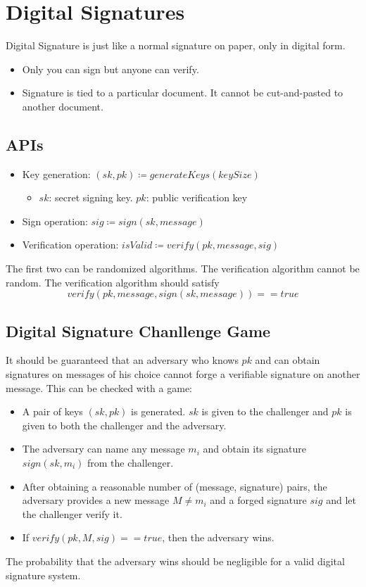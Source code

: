 \section{Digital Signatures}
Digital Signature is just like a normal signature on paper, only in digital form.
\begin{itemize}
  \item Only you can sign but anyone can verify.
  \item Signature is tied to a particular document. It cannot be cut-and-pasted to another document.
\end{itemize}
\subsection{APIs}
\begin{itemize}
  \item Key generation: $(sk, pk)\coloneqq generateKeys(keySize)$
  \begin{itemize}
    \item $sk$: secret signing key. $pk$: public verification key
  \end{itemize}
  \item Sign operation: $sig\coloneqq sign(sk, message)$
  \item Verification operation: $isValid\coloneqq verify(pk, message, sig)$
\end{itemize}
The first two can be randomized algorithms. The verification algorithm cannot be random. The verification algorithm should satisfy 
\[verify(pk, message, sign(sk, message)) == true \]
\subsection{Digital Signature Chanllenge Game}
It should be guaranteed that an adversary who knows $pk$ and can obtain signatures on messages of his choice cannot forge a verifiable signature on another message. This can be checked with a game:
\begin{itemize}
  \item A pair of keys $(sk, pk)$ is generated. $sk$ is given to the challenger and $pk$ is given to both the challenger and the adversary.
  \item The adversary can name any message $m_i$ and obtain its signature $sign(sk, m_i)$ from the challenger.
  \item After obtaining a reasonable number of (message, signature) pairs, the adversary provides a new message $M\neq m_i$ and a forged signature $sig$ and let the challenger verify it.
  \item If $verify(pk, M, sig) == true$, then the adversary wins.
\end{itemize}
The probability that the adversary wins should be negligible for a valid digital signature system.
